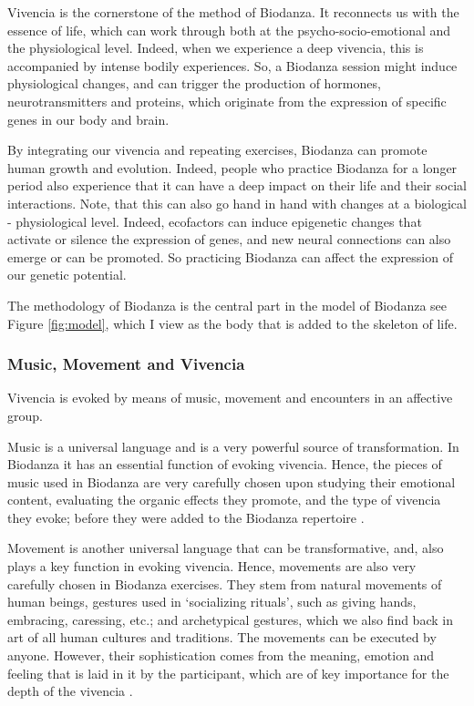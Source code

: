 \documentclass[
  11pt,
]{book}
\begin{document}
Vivencia is the cornerstone of the method of Biodanza. It reconnects us with the essence of life, which can work through both at the psycho-socio-emotional and the physiological level. Indeed, when we experience a deep vivencia, this is accompanied by intense bodily experiences. So, a Biodanza session might induce physiological changes, and can trigger the production of hormones, neurotransmitters and proteins, which originate from the expression of specific genes in our body and brain.

By integrating our vivencia and repeating exercises, Biodanza can promote human growth and evolution. Indeed, people who practice Biodanza for a longer period also experience that it can have a deep impact on their life and their social interactions. Note, that this can also go hand in hand with changes at a biological - physiological level. Indeed, ecofactors can induce epigenetic changes that activate or silence the expression of genes, and new neural connections can also emerge or can be promoted. So practicing Biodanza can affect the expression of our genetic potential.

The methodology of Biodanza is the central part in the model of Biodanza see Figure \ref{fig:model}, which I view as the body that is added to the skeleton of life.

\hypertarget{music-movement-and-vivencia}{%
\subsubsection{Music, Movement and Vivencia}\label{music-movement-and-vivencia}}

Vivencia is evoked by means of music, movement and encounters in an affective group.

Music is a universal language and is a very powerful source of transformation. In Biodanza it has an essential function of evoking vivencia. Hence, the pieces of music used in Biodanza are very carefully chosen upon studying their emotional content, evaluating the organic effects they promote, and the type of vivencia they evoke; before they were added to the Biodanza repertoire \citep{toro2008}.

Movement is another universal language that can be transformative, and, also plays a key function in evoking vivencia. Hence, movements are also very carefully chosen in Biodanza exercises. They stem from natural movements of human beings, gestures used in `socializing rituals', such as giving hands, embracing, caressing, etc.; and archetypical gestures, which we also find back in art of all human cultures and traditions. The movements can be executed by anyone. However, their sophistication comes from the meaning, emotion and feeling that is laid in it by the participant, which are of key importance for the depth of the vivencia \citep{toro2008}.
\end{document}
